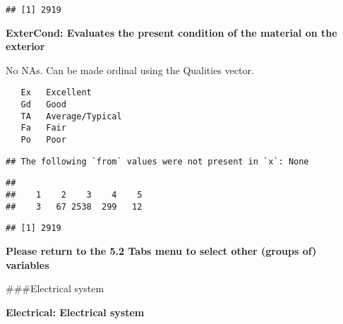 \documentclass[]{article}
\newenvironment{Shaded}{\begin{snugshade}}{\end{snugshade}}
\newcommand{\KeywordTok}[1]{\textcolor[rgb]{0.13,0.29,0.53}{\textbf{#1}}}
\newcommand{\NormalTok}[1]{#1}
\newcommand{\OperatorTok}[1]{\textcolor[rgb]{0.81,0.36,0.00}{\textbf{#1}}}
\begin{document}
\begin{verbatim}
## [1] 2919
\end{verbatim}

\textbf{ExterCond: Evaluates the present condition of the material on
the exterior}

No NAs. Can be made ordinal using the Qualities vector.

\begin{verbatim}
   Ex   Excellent
   Gd   Good
   TA   Average/Typical
   Fa   Fair
   Po   Poor
\end{verbatim}

\begin{Shaded}
\end{Shaded}

\begin{verbatim}
## The following `from` values were not present in `x`: None
\end{verbatim}

\begin{Shaded}
\end{Shaded}

\begin{verbatim}
## 
##    1    2    3    4    5 
##    3   67 2538  299   12
\end{verbatim}

\begin{Shaded}
\end{Shaded}

\begin{verbatim}
## [1] 2919
\end{verbatim}

\textbf{Please return to the 5.2 Tabs menu to select other (groups of)
variables}

\#\#\#Electrical system

\textbf{Electrical: Electrical system}
\end{document}
